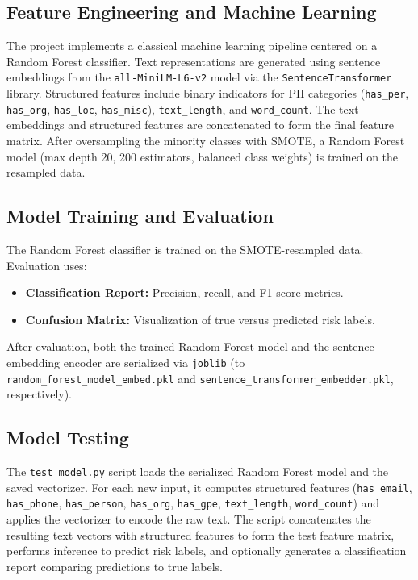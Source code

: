 \documentclass{article}
\begin{document}
\subsection{Feature Engineering and Machine Learning}
The project implements a classical machine learning pipeline centered on a Random Forest classifier. Text representations are generated using sentence embeddings from the \texttt{all-MiniLM-L6-v2} model via the \texttt{SentenceTransformer} library. Structured features include binary indicators for PII categories (\texttt{has\_per}, \texttt{has\_org}, \texttt{has\_loc}, \texttt{has\_misc}), \texttt{text\_length}, and \texttt{word\_count}. The text embeddings and structured features are concatenated to form the final feature matrix. After oversampling the minority classes with SMOTE, a Random Forest model (max depth 20, 200 estimators, balanced class weights) is trained on the resampled data.

\subsection{Model Training and Evaluation}
The Random Forest classifier is trained on the SMOTE-resampled data. Evaluation uses:
\begin{itemize}
    \item \textbf{Classification Report:} Precision, recall, and F1-score metrics.
    \item \textbf{Confusion Matrix:} Visualization of true versus predicted risk labels.
\end{itemize}
After evaluation, both the trained Random Forest model and the sentence embedding encoder are serialized via \texttt{joblib} (to \texttt{random\_forest\_model\_embed.pkl} and \texttt{sentence\_transformer\_embedder.pkl}, respectively).

\subsection{Model Testing}
The \texttt{test\_model.py} script loads the serialized Random Forest model and the saved vectorizer. For each new input, it computes structured features (\texttt{has\_email}, \texttt{has\_phone}, \texttt{has\_person}, \texttt{has\_org}, \texttt{has\_gpe}, \texttt{text\_length}, \texttt{word\_count}) and applies the vectorizer to encode the raw text. The script concatenates the resulting text vectors with structured features to form the test feature matrix, performs inference to predict risk labels, and optionally generates a classification report comparing predictions to true labels.
\end{document}
